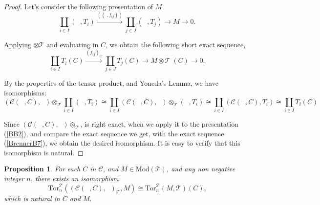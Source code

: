 \documentclass{amsart}
\theoremstyle{plain}
\newtheorem{proposition}{Proposition}
\numberwithin{equation}{section}
\begin{document}
\begin{proof}
Let's consider the following presentation of $M$
\begin{equation}
\coprod_{i\in I}(\;\;,T_{i})\overset{((\;,f_{ij}))}{\rightarrow }\coprod_{j\in J}(\;\;,T_{j})\rightarrow M\rightarrow 0.  \label{BB2}
\end{equation}

Applying $\otimes \mathcal{T}$ and evaluating in $C$, we obtain the
following short exact sequence,
\begin{equation}
\coprod_{i\in I}T_{i}(C)\xrightarrow {(f_{ij})_C}\coprod_{j\in
J}T_{j}(C)\rightarrow M\otimes \mathcal{T}\;(C)\rightarrow 0\text{.}
\label{BrennerB7}
\end{equation}

By the properties of the tensor product, and Yoneda's Lemma, we have
isomorphisms:
\begin{equation*}
(\mathcal{C}(\;\;,C),\;\;)\otimes _{\mathcal{T}}\coprod_{i\in
I}(\;\;,T_{i})\cong \coprod_{i\in I}(\mathcal{C}(\;\;,C),\;\;)\otimes _{\mathcal{T}}(\;\;,T_{i})\cong \coprod_{i\in I}(\mathcal{C}(\;\;,C),T_{i})\cong \coprod_{i\in I}T_{i}(C)
\end{equation*}

Since $(\mathcal{C}(\;\;,C),\;\;)\otimes _{\mathcal{T}}$, is right exact,
when we apply it to the presentation (\ref{BB2}), and compare the exact
sequence we get, with the exact sequence (\ref{BrennerB7}), we obtain the
desired isomorphism. It is easy to verify that this isomorphism is natural.
\end{proof}

\begin{proposition}
\label{BB4} For each $C$ in $\mathcal{C}$, and $M\in \mathrm{\mathrm{Mod}}(\mathcal{T})$, and any non negative integer $n$, there exists an isomorphism
\begin{equation}
\mathrm{Tor}_{n}^{\mathcal{T}}((\mathcal{C}(\;\;,C),\;\;)_{\mathcal{T}},M)\cong \mathrm{Tor}_{n}^{\mathcal{T}}(M,\mathcal{T})(C)\text{,}
\end{equation}which is natural in $C$ and $M.$
\end{proposition}
\end{document}
